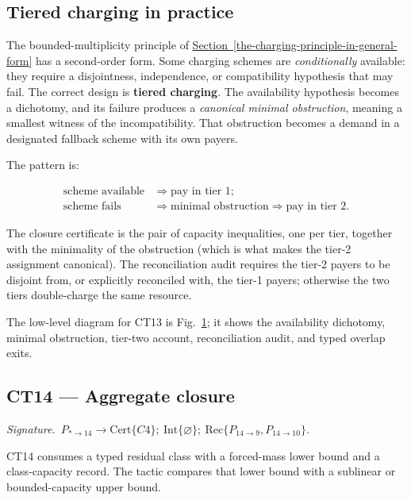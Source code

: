 \documentclass[
  11pt,
]{article}
\theoremstyle{definition}
\newcommand{\secref}[1]{\hyperref[#1]{Section~\ref*{#1}}}
\newcommand{\ctsignature}[1]{\par\noindent\emph{Signature.}\ #1\par\medskip}
\newcommand{\ctcert}[1]{\mathrm{Cert}\{#1\}}
\newcommand{\ctint}[1]{\mathrm{Int}\{#1\}}
\newcommand{\ctrec}[1]{\mathrm{Rec}\{#1\}}
\newcommand{\ctnone}{\varnothing}
\begin{document}
\begin{figure}[p]
\label{fig:ct13-tiered-charging}
\end{figure}
\FloatBarrier

\subsection*{Tiered charging in practice}

The bounded-multiplicity principle of \secref{the-charging-principle-in-general-form} has a second-order
form. Some charging schemes are \emph{conditionally} available: they
require a disjointness, independence, or compatibility hypothesis that
may fail. The correct design is \textbf{tiered charging}. The
availability hypothesis becomes a dichotomy, and its failure produces a
\emph{canonical minimal obstruction}, meaning a smallest witness of the
incompatibility. That obstruction becomes a demand in a designated
fallback scheme with its own payers.

The pattern is:

\[
\begin{aligned}
\text{scheme available} &\Rightarrow \text{pay in tier 1};\\
\text{scheme fails} &\Rightarrow \text{minimal obstruction} \Rightarrow \text{pay in tier 2}.
\end{aligned}
\]

The closure certificate is the pair of capacity inequalities, one per
tier, together with the minimality of the obstruction (which is what
makes the tier-2 assignment canonical). The reconciliation audit requires
the tier-2 payers to be disjoint from, or explicitly reconciled with, the
tier-1 payers; otherwise the two tiers double-charge the same resource.

The low-level diagram for CT13 is Fig.~\ref{fig:ct13-tiered-charging};
it shows the availability dichotomy, minimal obstruction, tier-two
account, reconciliation audit, and typed overlap exits.



\subsection{CT14 --- Aggregate closure}\label{ct:14}\label{aggregate-closure-mass-bounds-on-residual-classes}
\ctsignature{\(P_{\ast\to14}\to \ctcert{C4};\ \ctint{\ctnone};\ \ctrec{P_{14\to9},P_{14\to10}}\).}

CT14 consumes a typed residual class with a forced-mass lower bound and a
class-capacity record.  The tactic compares that lower bound with a
sublinear or bounded-capacity upper bound.
\end{document}
